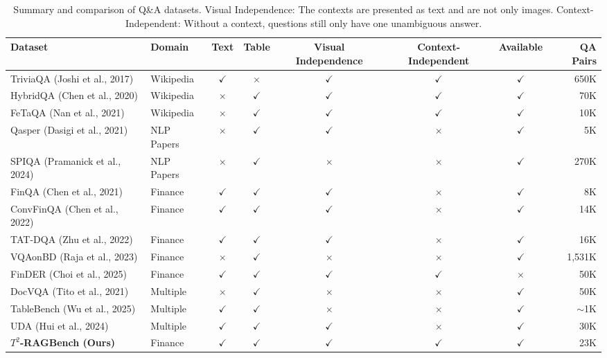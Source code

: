 \documentclass[10pt]{article}
\begin{document}
\begin{table}[t]
\centering
\caption{Summary and comparison of Q\&A datasets. Visual Independence: The contexts are presented as text and are not only images. Context-Independent: Without a context, questions still only have one unambiguous answer.}
\label{tab:datasets}
\begin{tabular}{l l c c c c c r}
\toprule
Dataset & Domain & Text & Table & Visual Independence & Context-Independent & Available & QA Pairs \\
\midrule
TriviaQA (Joshi et al., 2017) & Wikipedia & $\checkmark$ & $\times$ & $\checkmark$ & $\checkmark$ & $\checkmark$ & 650K \\
HybridQA (Chen et al., 2020) & Wikipedia & $\times$ & $\checkmark$ & $\checkmark$ & $\checkmark$ & $\checkmark$ & 70K \\
FeTaQA (Nan et al., 2021) & Wikipedia & $\times$ & $\checkmark$ & $\checkmark$ & $\checkmark$ & $\checkmark$ & 10K \\
Qasper (Dasigi et al., 2021) & NLP Papers & $\times$ & $\checkmark$ & $\checkmark$ & $\times$ & $\checkmark$ & 5K \\
SPIQA (Pramanick et al., 2024) & NLP Papers & $\times$ & $\checkmark$ & $\times$ & $\times$ & $\checkmark$ & 270K \\
FinQA (Chen et al., 2021) & Finance & $\checkmark$ & $\checkmark$ & $\checkmark$ & $\times$ & $\checkmark$ & 8K \\
ConvFinQA (Chen et al., 2022) & Finance & $\checkmark$ & $\checkmark$ & $\checkmark$ & $\times$ & $\checkmark$ & 14K \\
TAT-DQA (Zhu et al., 2022) & Finance & $\checkmark$ & $\checkmark$ & $\checkmark$ & $\times$ & $\checkmark$ & 16K \\
VQAonBD (Raja et al., 2023) & Finance & $\times$ & $\checkmark$ & $\times$ & $\times$ & $\checkmark$ & 1,531K \\
FinDER (Choi et al., 2025) & Finance & $\checkmark$ & $\checkmark$ & $\checkmark$ & $\checkmark$ & $\times$ & 50K \\
DocVQA (Tito et al., 2021) & Multiple & $\times$ & $\checkmark$ & $\times$ & $\times$ & $\checkmark$ & 50K \\
TableBench (Wu et al., 2025) & Multiple & $\checkmark$ & $\checkmark$ & $\times$ & $\times$ & $\checkmark$ & $\sim$1K \\
UDA (Hui et al., 2024) & Multiple & $\checkmark$ & $\checkmark$ & $\checkmark$ & $\times$ & $\checkmark$ & 30K \\
\textbf{$T^{2}$-RAGBench (Ours)} & Finance & $\checkmark$ & $\checkmark$ & $\checkmark$ & $\checkmark$ & $\checkmark$ & 23K \\
\bottomrule
\end{tabular}
\end{table}
\end{document}
